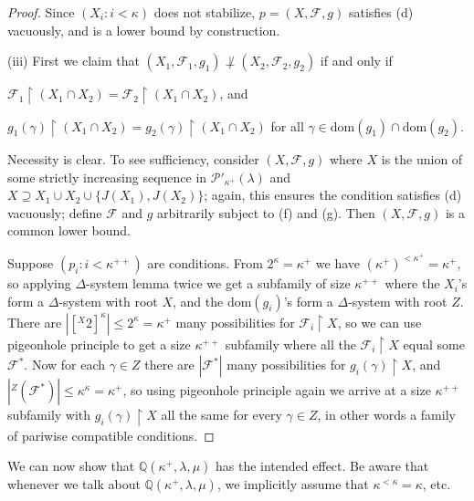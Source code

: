 \documentclass[10pt,reqno]{amsart}
\theoremstyle{plain}
\theoremstyle{definition}
\theoremstyle{remark}
\begin{document}
\begin{proof}
Since $(X_i:i<\kappa)$ does not stabilize, $p=(X,\mathcal{F},g)$ satisfies (d) vacuously, and is a lower bound by construction.

(iii) First we claim that $(X_1,\mathcal{F}_1,g_1)\not\perp(X_2,\mathcal{F}_2,g_2)$ if and only if 

\begin{center}
$\mathcal{F}_1\upharpoonright(X_1\cap X_2)=\mathcal{F}_2\upharpoonright(X_1\cap X_2)$, and
\end{center}

\begin{center}
$g_1(\gamma)\upharpoonright(X_1\cap X_2)=g_2(\gamma)\upharpoonright(X_1\cap X_2)$ for all $\gamma\in\mathrm{dom}(g_1)\cap\mathrm{dom}(g_2)$.
\end{center}

Necessity is clear. To see sufficiency, consider $(X,\mathcal{F},g)$ where $X$ is the union of some strictly increasing sequence in $\mathcal{P}'_{\kappa^+}(\lambda)$ and $X\supseteq X_1\cup X_2\cup\{J(X_1),J(X_2)\}$; again, this ensures the condition satisfies (d) vacuously; define $\mathcal{F}$ and $g$ arbitrarily subject to (f) and (g). Then $(X,\mathcal{F},g)$ is a common lower bound.

Suppose $(p_i:i<\kappa^{++})$ are conditions. From $2^\kappa=\kappa^+$ we have $(\kappa^+)^{<\kappa^+}=\kappa^+$, so applying $\Delta$-system lemma twice we get a subfamily of size $\kappa^{++}$ where the $X_i$'s form a $\Delta$-system with root $X$, and the $\mathrm{dom}(g_i)$'s form a $\Delta$-system with root $Z$. There are $|[{}^{X}2]^\kappa|\leq 2^\kappa=\kappa^+$ many possibilities for $\mathcal{F}_i\upharpoonright X$, so we can use pigeonhole principle to get a size $\kappa^{++}$ subfamily where all the $\mathcal{F}_i\upharpoonright X$ equal some $\mathcal{F}^*$. Now for each $\gamma\in Z$ there are $|\mathcal{F}^*|$ many possibilities for $g_i(\gamma)\upharpoonright X$, and $|{}^{Z}(\mathcal{F}^*)|\leq\kappa^\kappa=\kappa^+$, so using pigeonhole principle again we arrive at a size $\kappa^{++}$ subfamily with $g_i(\gamma)\upharpoonright X$ all the same for every $\gamma\in Z$, in other words a family of pariwise compatible conditions.
\end{proof}



We can now show that $\mathbb{Q}(\kappa^+,\lambda,\mu)$ has the intended effect. Be aware that whenever we talk about $\mathbb{Q}(\kappa^+,\lambda,\mu)$, we implicitly assume that $\kappa^{<\kappa}=\kappa$, etc.
\end{document}

